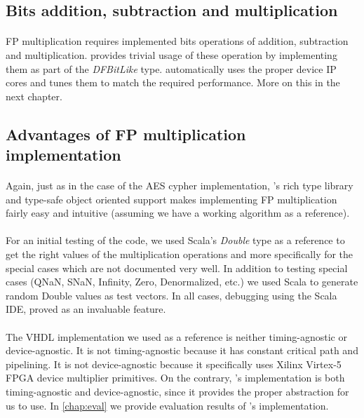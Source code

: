 \subsection*{Bits addition, subtraction and multiplication}
\paragraph{}FP multiplication requires implemented bits operations of addition, subtraction and multiplication. \cf provides trivial usage of these operation by implementing them as part of the \textit{DFBitLike} type. \cf automatically uses the proper device IP cores and tunes them to match the required performance. More on this in the next chapter.

\subsection*{Advantages of \cf FP multiplication implementation}
\paragraph{}Again, just as in the case of the AES cypher implementation, \cfns's rich type library and type-safe object oriented support makes implementing FP multiplication fairly easy and intuitive (assuming we have a working algorithm as a reference).
\paragraph{}For an initial testing of the code, we used Scala's \textit{Double} type as a reference to get the right values of the multiplication operations and more specifically for the special cases which are not documented very well. In addition to testing special cases (QNaN, SNaN, Infinity, Zero, Denormalized, etc.) we used Scala to generate random Double values as test vectors. In all cases, debugging using the Scala IDE, proved as an invaluable feature.
\paragraph{}The VHDL implementation we used as a reference is neither timing-agnostic or device-agnostic. It is not timing-agnostic because it has constant critical path and pipelining. It is not device-agnostic because it specifically uses Xilinx Virtex-5 FPGA device multiplier primitives. On the contrary, \cfns's implementation is both timing-agnostic and device-agnostic, since it provides the proper abstraction for us to use. In \autoref{chap:eval} we provide evaluation results of \cfns's implementation.
